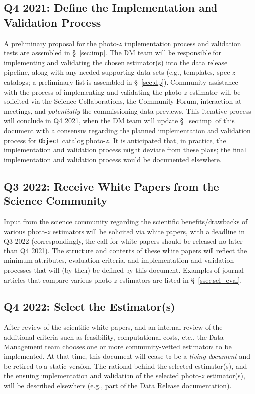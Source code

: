 \documentclass[DM,lsstdraft,toc]{lsstdoc}
\begin{document}
\subsection{Q4 2021: Define the Implementation and Validation Process}\label{ssec:time_impl}

A preliminary proposal for the photo-$z$ implementation process and validation tests are assembled in \S~\ref{sec:imp}.
The DM team will be responsible for implementing and validating the chosen estimator(s) into the data release pipeline, along with any needed supporting data sets (e.g., templates, spec-$z$ catalogs; a preliminary list is assembled in \S~\ref{sec:dp}).
Community assistance with the process of implementing and validating the photo-$z$ estimator will be solicited via the Science Collaborations, the Community Forum, interaction at meetings, and {\it potentially} the commissioning data previews.
This iterative process will conclude in Q4 2021, when the DM team will update \S~\ref{sec:imp} of this document with a consensus regarding the planned implementation and validation process for {\tt Object} catalog photo-$z$.
It is anticipated that, in practice, the implementation and validation process might deviate from these plans; the final implementation and validation process would be documented elsewhere.

\subsection{Q3 2022: Receive White Papers from the Science Community}\label{ssec:time_wp}

Input from the science community regarding the scientific benefits/drawbacks of various photo-$z$ estimators will be solicited via white papers, with a deadline in Q3 2022 (correspondingly, the call for white papers should be released no later than Q4 2021). 
The structure and contents of these white papers will reflect the minimum attributes, evaluation criteria, and implementation and validation processes that will (by then) be defined by this document.
Examples of journal articles that compare various photo-$z$ estimators are listed in \S~\ref{ssec:sel_eval}.

\subsection{Q4 2022: Select the Estimator(s)}\label{ssec:time_sel}

After review of the scientific white papers, and an internal review of the additional criteria such as feasibility, computational costs, etc., the Data Management team chooses one or more community-vetted estimators to be implemented.
At that time, this document will cease to be a {\it living document} and be retired to a static version.
The rational behind the selected estimator(s), and the ensuing implementation and validation of the selected photo-$z$ estimator(s), will be described elsewhere (e.g., part of the Data Release documentation).
\end{document}
